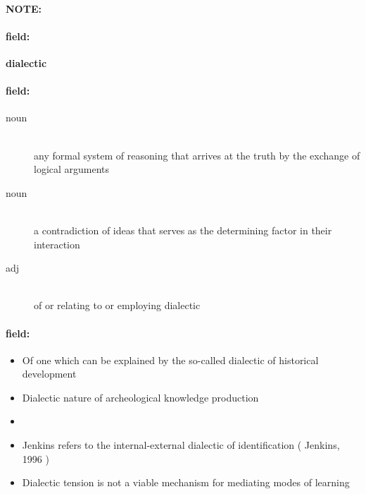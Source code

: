 \documentclass[12pt]{article}
\newenvironment{note}{\paragraph{NOTE:}}{}
\newenvironment{field}{\paragraph{field:}}{}
\begin{document}
\begin{note}
\begin{field}
\textbf{\large dialectic}
\end{field}


\begin{field}
\begin{description}
\item[noun] \hfill \\ 
any formal system of reasoning that arrives at the truth by the exchange of logical arguments

\item[noun] \hfill \\ 
a contradiction of ideas that serves as the determining factor in their interaction

\item[adj] \hfill \\ 
of or relating to or employing dialectic

\end{description}
\end{field}

\begin{field}
\begin{itemize}
\item Of one which can be explained by the so-called dialectic of historical development
\item Dialectic nature of archeological knowledge production
\item 
\item Jenkins refers to the internal-external dialectic of identification ( Jenkins, 1996 )
\item Dialectic tension is not a viable mechanism for mediating modes of learning
\end{itemize}
\end{field}
\end{note}
\end{document}
